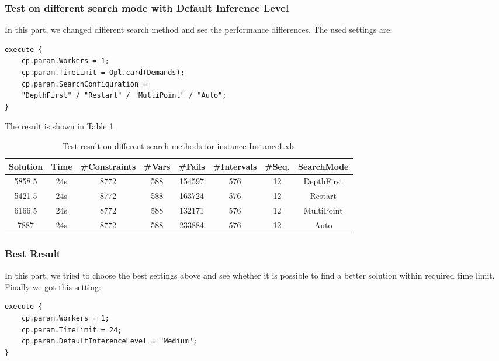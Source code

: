 \documentclass[a4paper, 12pt]{article}
\begin{document}
\subsubsection{Test on different search mode with Default Inference Level}

In this part, we changed different search method and see the performance differences. The used settings are: 

\begin{lstlisting}
execute {
    cp.param.Workers = 1;
    cp.param.TimeLimit = Opl.card(Demands); 
    cp.param.SearchConfiguration = 
    "DepthFirst" / "Restart" / "MultiPoint" / "Auto";
}
\end{lstlisting}

The result is shown in Table \ref{diffSear1}

\begin{table}
    \centering
    \caption{Test result on different search methods for instance Instance1.xls}
    \label{diffSear1}
    \begin{tabular}{|c|c|c|c|c|c|c|c|}
        \hline
        Solution & Time & \#Constraints & \#Vars & \#Fails & \#Intervals & \#Seq. & SearchMode \\
        \hline
        5858.5 & 24s & 8772 & 588 & 154597 & 576 & 12 & DepthFirst \\
        \hline 
        5421.5 & 24s & 8772 & 588 & 163724 & 576 & 12 & Restart \\
        \hline
        6166.5 & 24s & 8772 & 588 & 132171 & 576 & 12 & MultiPoint \\
        \hline
        7887 & 24s & 8772 & 588 & 233884 & 576 & 12 & Auto \\
        \hline
    \end{tabular}
\end{table}

\subsubsection{Best Result}

In this part, we tried to choose the best settings above and see whether it is possible to find a better solution within required time limit. Finally we got this setting: 

\begin{lstlisting}
execute {
    cp.param.Workers = 1;
    cp.param.TimeLimit = 24; 
    cp.param.DefaultInferenceLevel = "Medium";
}
\end{lstlisting}
\end{document}
